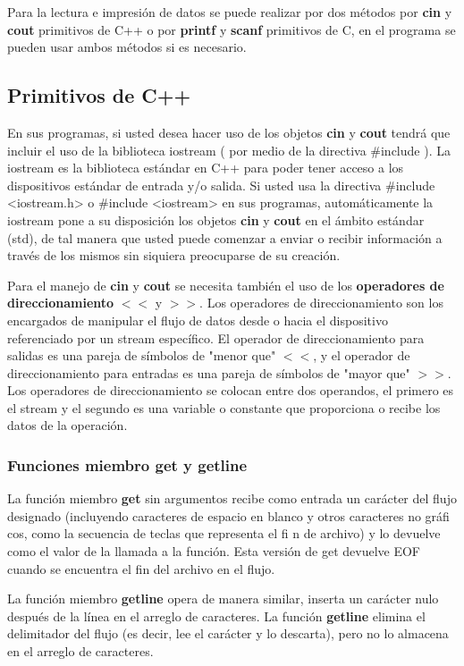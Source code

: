 Para la lectura e impresión de datos se puede realizar por dos métodos por \textbf{cin} y \textbf{cout} primitivos
de C++ o por \textbf{printf} y \textbf{scanf} primitivos de C, en el programa se pueden usar ambos métodos si es
necesario.

\subsection{Primitivos de C++}

En sus programas, si usted desea hacer uso de los objetos  \textbf{cin} y \textbf{cout} tendrá que incluir el uso de la
biblioteca iostream ( por medio de la directiva \#include ). La iostream es la biblioteca estándar en
C++ para poder tener acceso a los dispositivos estándar de entrada y/o salida.
Si usted usa la directiva \#include <iostream.h> \quad o \#include <iostream> \quad en sus programas, automáticamente la iostream pone a su disposición los objetos \textbf{cin} y \textbf{cout} en el ámbito estándar (std), de tal
manera que usted puede comenzar a enviar o recibir información a través de los mismos sin siquiera
preocuparse de su creación.

Para el manejo de \textbf{cin} y \textbf{cout} se necesita también el uso de los \textbf{operadores de direccionamiento}
$<<$ y $>>$. Los operadores de direccionamiento son los encargados de manipular el flujo de datos
desde o hacia el dispositivo referenciado por un stream específico. El operador de direccionamiento
para salidas es una pareja de símbolos de "menor que" $<<$, y el operador de direccionamiento
para entradas es una pareja de símbolos de "mayor que" $>>$. Los operadores de direccionamiento
se colocan entre dos operandos, el primero es el stream y el segundo es una variable o constante
que proporciona o recibe los datos de la operación.

\subsubsection{Funciones miembro get y getline}

La función miembro \textbf{get} sin argumentos recibe como entrada un carácter del flujo designado (incluyendo caracteres de espacio en blanco y otros caracteres no gráfi cos, como la secuencia de teclas que representa el fi n de archivo) y lo devuelve como el
valor de la llamada a la función. Esta versión de get devuelve EOF cuando se encuentra el fin del archivo en el flujo.

La función miembro \textbf{getline} opera de manera similar, inserta un carácter nulo después de la línea en el arreglo de caracteres. La función \textbf{getline} elimina el delimitador del flujo (es decir, lee
el carácter y lo descarta), pero no lo almacena en el arreglo de caracteres.

